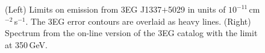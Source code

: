 \begin{figure}[p]
\caption{\label{FIG::OBSERVATIONS::J1337UL} (Left) Limits on 
emission from 3EG J1337$+$5029 in units of
$10^{-11}$\,cm$^{-2}$\,s$^{-1}$. The 3EG error contours are overlaid
as heavy lines. (Right) Spectrum from the on-line version of the 3EG
catalog with the limit at 350\,GeV.}
\end{figure}

